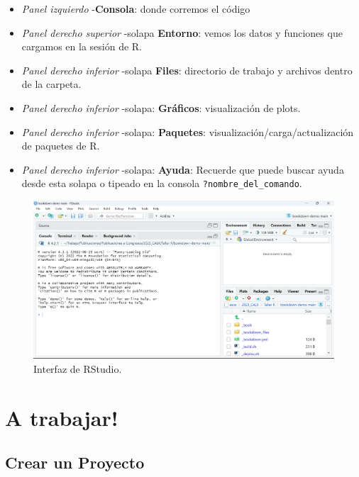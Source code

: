 \documentclass[
]{book}
\providecommand{\tightlist}{%
  \setlength{\itemsep}{0pt}\setlength{\parskip}{0pt}}
\begin{document}
\begin{itemize}
\tightlist
\item
  \emph{Panel izquierdo} -\textbf{Consola}: donde corremos el código
\item
  \emph{Panel derecho superior} -solapa \textbf{Entorno}: vemos los datos y funciones que cargamos en la sesión de R.
\item
  \emph{Panel derecho inferior} -solapa \textbf{Files}: directorio de trabajo y archivos dentro de la carpeta.
\item
  \emph{Panel derecho inferior} -solapa: \textbf{Gráficos}: visualización de plots.
\item
  \emph{Panel derecho inferior} -solapa: \textbf{Paquetes}: visualización/carga/actualización de paquetes de R.
\item
  \emph{Panel derecho inferior} -solapa: \textbf{Ayuda}: Recuerde que puede buscar ayuda desde esta solapa o tipeado en la consola \texttt{?nombre\_del\_comando}.
\end{itemize}

\begin{figure}

{\centering \includegraphics[width=1\linewidth]{./images/rstudio} 

}

\caption{Interfaz de RStudio.}\label{fig:rstudio}
\end{figure}

\hypertarget{a-trabajar}{%
\section{A trabajar!}\label{a-trabajar}}

\hypertarget{crear-un-proyecto}{%
\subsection{\texorpdfstring{Crear un \textbf{Proyecto}}{Crear un Proyecto}}\label{crear-un-proyecto}}
\end{document}

